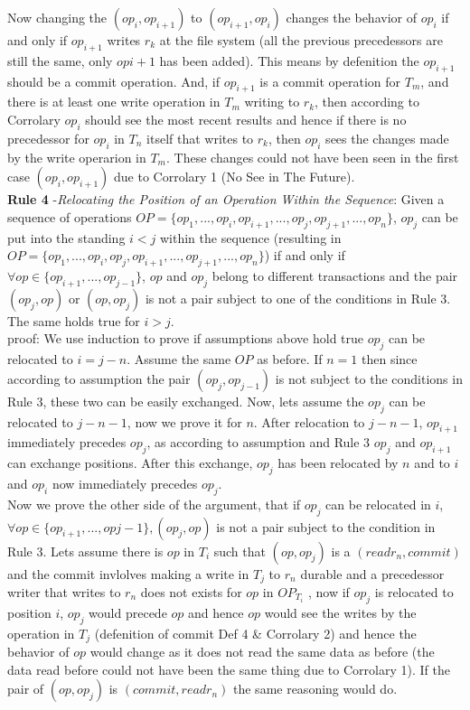 \documentclass[a4paper, 11pt]{article}
\begin{document}
Now changing the $(op_i, op_{i+1})$ to $(op_{i+1}, op_i)$ changes the behavior of $op_i$ if and only if $op_{i+1}$ writes $r_k$ at the file system (all the previous precedessors are still the same, only $op{i+1}$ has been added). This means by defenition the $op_{i+1}$ should be a commit operation. And, if $op_{i+1}$ is a commit operation for $T_m$, and there is at least one write operation in $T_m$ writing to $r_k$, then according to Corrolary $op_i$ should see the most recent results and hence if there is no precedessor for $op_i$ in $T_n$ itself that writes to $r_k$, then $op_i$ sees the changes made by the write operarion in $T_m$. These changes could not have been seen in the first case $(op_i, op_{i+1})$ due to Corrolary 1 (No See in The Future).\\ 


\textbf{Rule 4} -\emph{Relocating the Position of an Operation Within the Sequence}: Given a sequence of operations $OP = \{op_1, ..., op_i, op_{i+1}, ..., op_j, op_{j+1}, ..., op_n\}$, $op_j$ can be put into the standing $i<j$ within the sequence (resulting in $OP = \{op_1, ..., op_i,op_j,op_{i+1},..., op_{j+1},...,op_n\}$) if and only if $\forall op \in \{op_{i+1}, ..., op_{j-1}\}$, $op$ and $op_j$ belong to different transactions and the pair $(op_j, op)$ or $(op,op_j)$ is not a pair subject to one of the conditions in Rule 3. The same holds true for $i>j$.\\

proof: We use induction to prove if assumptions above hold true $op_j$ can be relocated to $i = j-n$. Assume the same $OP$ as before. If $n = 1$ then since according to assumption the pair $(op_j, op_{j-1})$ is not subject to the conditions in Rule 3, these two can be easily exchanged. Now, lets assume the $op_j$ can be relocated to $j-n-1$, now we prove it for $n$.  After relocation to $j-n-1$, $op_{i+1}$ immediately precedes $op_j$, as according to assumption and Rule 3 $op_j$ and $op_{i+1}$ can exchange positions. After this exchange, $op_j$ has been relocated by $n$ and to $i$ and $op_i$ now immediately precedes $op_j$.\\

Now we prove the other side of the argument, that if $op_j$ can be relocated in $i$, $\forall op \in \{op_{i+1}, ..., op{j-1}\}, (op_j, op)$ is not a pair subject to the condition in Rule 3. Lets assume there is $op$ in $T_i$ such that $(op, op_{j})$ is a $({read r_n}, {commit})$  and the commit invlolves making a write in $T_j$ to $r_n$ durable and a precedessor writer that writes to $r_n$ does not exists for $op$ in $OP_{T_i}$ , now if $op_j$ is relocated to position $i$, $op_j$ would precede $op$ and hence $op$ would see the writes by the operation in $T_j$ (defenition of commit Def 4 \& Corrolary  2) and hence the behavior of $op$ would change as it does not read the same data as before (the data read before could not have been the same thing due to Corrolary 1). If the pair of $(op, op_j)$ is $({commit}, {read r_n})$ the same reasoning would do.\\   
\end{document}

